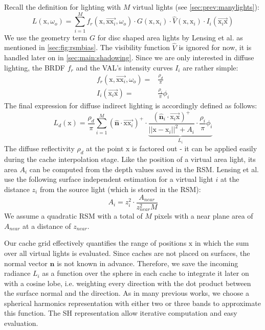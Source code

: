 \documentclass[thesis.tex]{subfiles}
\begin{document}
Recall the definition for lighting with $M$ virtual lights (see \autoref{sec:prev:manylights}):
\begin{equation}
L(\mathrm{x}, \omega_o) = \sum\limits_{i=1}^{M} f_r(\mathrm{x}, \overrightarrow{\mathrm{x}\mathrm{x}_i}, \omega_o) \cdot G(\mathrm{x}, \mathrm{x}_i) \cdot \hat{V}(\mathrm{x}, \mathrm{x}_i) \cdot I_i(\overrightarrow{\mathrm{x}_i\mathrm{x}})
\end{equation}
We use the geometry term $G$ for disc shaped area lights by Lensing et al. \cite{bib:LightskinPaper} as mentioned in \autoref{sec:fig:rsmbias}.
The visibility function $\hat{V}$ is ignored for now, it is handled later on in \autoref{sec:main:shadowing}.
Since we are only interested in diffuse lighting, the BRDF $f_r$ and the VAL's intensity curves $I_i$ are rather simple:
\begin{align}
f_r(\mathrm{x}, \overrightarrow{\mathrm{x}\mathrm{x}_i}, \omega_o) =& \frac{\rho_d}{\pi}\\
I_i(\overrightarrow{\mathrm{x}_i\mathrm{x}}) =& \frac{\rho_i}{\pi} \phi_i
\end{align}
The final expression for diffuse indirect lighting is accordingly defined as follows:
\begin{equation} \label{eq:rsmdiffuse}
L_d (\mathrm{x}) = \frac{\rho_d}{\pi} \sum\limits_{i=1}^{M} 
(\hat{\mathbf{n}} \cdot \overrightarrow{\mathrm{x}\mathrm{x}_i} )^+ \cdot
\underbrace{\frac{(\hat{\mathbf{n}}_i\cdot \overrightarrow{\mathrm{x}_i\mathrm{x}})^+}{||\mathrm{x} - \mathrm{x}_i||^2 + A_i} \cdot  \frac{\rho_i}{\pi} \phi_i}_{L_i}
\end{equation}
The diffuse reflectivity $\rho_d$ at the point $\mathrm{x}$ is factored out - it can be applied easily during the cache interpolation stage.
Like the position of a virtual area light, its area $A_i$ can be computed from the depth values saved in the RSM.
Lensing et al. \cite{bib:LightskinPaper} use the following surface independent estimation for a virtual light $i$ at the distance $z_i$ from the source light (which is stored in the RSM):
\begin{equation}
A_i = z_i^2 \cdot \frac{A_{near}}{z_{near}^2 M}
\end{equation}
We assume a quadratic RSM with a total of $M$ pixels with a near plane area of $A_{near}$ at a distance of $z_{near}$.

Our cache grid effectively quantifies the range of positions $\mathrm{x}$ in which the sum over all virtual lights is evaluated.
Since caches are not placed on surfaces, the normal vector $\hat{\mathbf{n}}$ is not known in advance.
Therefore, we save the incoming radiance $L_i$ as a function over the sphere in each cache to integrate it later on with a cosine lobe, i.e. weighting every direction with the dot product between the surface normal and the direction.
As in many previous works, we choose a spherical harmonics representation with either two or three bands to approximate this function.
The SH representation allow iterative computation and easy evaluation.
\end{document}

